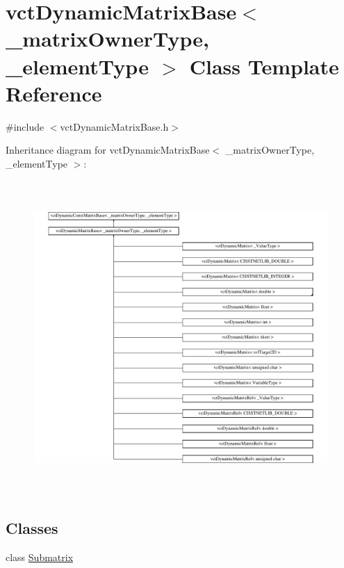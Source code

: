 \hypertarget{classvct_dynamic_matrix_base}{}\section{vct\+Dynamic\+Matrix\+Base$<$ \+\_\+matrix\+Owner\+Type, \+\_\+element\+Type $>$ Class Template Reference}
\label{classvct_dynamic_matrix_base}


{\ttfamily \#include $<$vct\+Dynamic\+Matrix\+Base.\+h$>$}

Inheritance diagram for vct\+Dynamic\+Matrix\+Base$<$ \+\_\+matrix\+Owner\+Type, \+\_\+element\+Type $>$\+:\begin{figure}[H]
\begin{center}
\leavevmode
\includegraphics[height=11.959799cm]{d6/d56/classvct_dynamic_matrix_base}
\end{center}
\end{figure}
\subsection*{Classes}
\begin{DoxyCompactItemize}
\item 
class \hyperlink{classvct_dynamic_matrix_base_1_1_submatrix}{Submatrix}
\end{DoxyCompactItemize}
